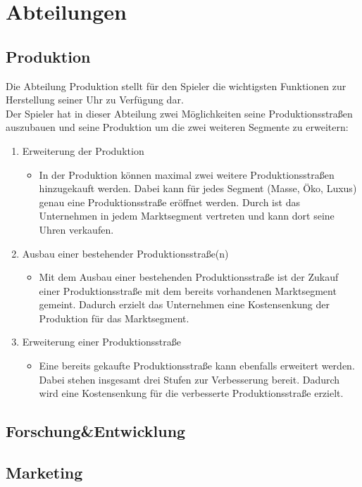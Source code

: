 \clearpage
\chapter{Abteilungen}
\section{Produktion}
Die Abteilung Produktion stellt für den Spieler die wichtigsten Funktionen zur Herstellung seiner Uhr zu Verfügung dar.\\ 
Der Spieler hat in dieser Abteilung zwei Möglichkeiten seine Produktionsstraßen auszubauen und seine Produktion um die zwei weiteren Segmente zu erweitern:
\begin{enumerate}
	\item Erweiterung der Produktion
\begin{itemize}
	\item In der Produktion können maximal zwei weitere Produktionsstraßen hinzugekauft werden. Dabei kann für jedes Segment (Masse, Öko, Luxus) genau eine Produktionsstraße eröffnet werden. Durch ist das Unternehmen in jedem Marktsegment vertreten und kann dort seine Uhren verkaufen.
\end{itemize}
	\item Ausbau einer bestehender Produktionsstraße(n)
\begin{itemize}
	\item Mit dem Ausbau einer bestehenden Produktionsstraße ist der Zukauf einer Produktionsstraße mit dem bereits vorhandenen Marktsegment gemeint. Dadurch erzielt das Unternehmen eine Kostensenkung der Produktion für das Marktsegment. 
\end{itemize}
	\item Erweiterung einer Produktionsstraße
\begin{itemize}
	\item Eine bereits gekaufte Produktionsstraße kann ebenfalls erweitert werden. Dabei stehen insgesamt drei Stufen zur Verbesserung bereit. Dadurch wird eine Kostensenkung für die verbesserte Produktionsstraße erzielt.   
\end{itemize}
\end{enumerate}
    
\section{Forschung\&Entwicklung}

\section{Marketing}

